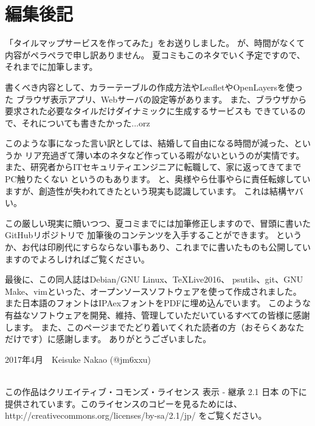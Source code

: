 \section*{編集後記}

「タイルマップサービスを作ってみた」をお送りしました。
が、時間がなくて内容がペラペラで申し訳ありません。
夏コミもこのネタでいく予定ですので、それまでに加筆します。

書くべき内容として、カラーテーブルの作成方法やLeafletやOpenLayersを使った
ブラウザ表示アプリ、Webサーバの設定等があります。
また、ブラウザから要求された必要なタイルだけダイナミックに生成するサービスも
できているので、それについても書きたかった...orz

このような事になった言い訳としては、結婚して自由になる時間が減った、というか
リア充過ぎて薄い本のネタなど作っている暇がないというのが実情です。
また、研究者からITセキュリティエンジニアに転職して、家に返ってきてまでPC触りたくない
というのもあります。
と、奥様やら仕事やらに責任転嫁していますが、創造性が失われてきたという現実も認識しています。
これは結構ヤバい。

この厳しい現実に贖いつつ、夏コミまでには加筆修正しますので、冒頭に書いたGitHubリポジトリで
加筆後のコンテンツを入手することができます。
というか、お代は印刷代にすらならない事もあり、これまでに書いたものも公開していますのでよろしければご覧ください。

最後に、この同人誌はDebian/GNU Linux、\TeX Live2016、
psutils、git、GNU Make、vimといった、オープンソースソフトウェアを使って作成されました。
また日本語のフォントはIPAexフォントをPDFに埋め込んでいます。
このような有益なソフトウェアを開発、維持、管理していただいているすべての皆様に感謝します。
また、このページまでたどり着いてくれた読者の方（おそらくあなただけです）に感謝します。
ありがとうございました。

\begin{flushright}
2017年4月　Keisuke Nakao (@jm6xxu) 
\end{flushright}

\clearpage
\mbox{}
\vspace{55em}\\
この作品はクリエイティブ・コモンズ・ライセンス 表示 - 継承 2.1 日本 の下に提供されています。このライセンスのコピーを見るためには、http://creativecommons.org/licenses/by-sa/2.1/jp/ をご覧ください。

